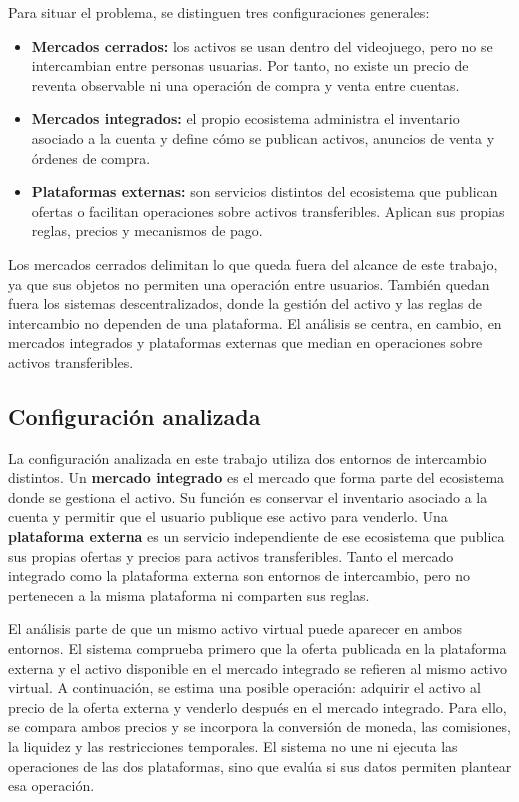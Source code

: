 Para situar el problema, se distinguen tres configuraciones generales:
\begin{itemize}
    \item \textbf{Mercados cerrados:} los activos se usan dentro del videojuego, pero no se intercambian entre personas usuarias. Por tanto, no existe un precio de reventa observable ni una operación de compra y venta entre cuentas.
    \item \textbf{Mercados integrados:} el propio ecosistema administra el inventario asociado a la cuenta y define cómo se publican activos, anuncios de venta y órdenes de compra.
    \item \textbf{Plataformas externas:} son servicios distintos del ecosistema que publican ofertas o facilitan operaciones sobre activos transferibles. Aplican sus propias reglas, precios y mecanismos de pago.
\end{itemize}

Los mercados cerrados delimitan lo que queda fuera del alcance de este trabajo, ya que sus objetos no permiten una operación entre usuarios. También quedan fuera los sistemas descentralizados, donde la gestión del activo y las reglas de intercambio no dependen de una plataforma. El análisis se centra, en cambio, en mercados integrados y plataformas externas que median en operaciones sobre activos transferibles.

\subsection{Configuración analizada}

La configuración analizada en este trabajo utiliza dos entornos de intercambio distintos. Un \textbf{mercado integrado} es el mercado que forma parte del ecosistema donde se gestiona el activo. Su función es conservar el inventario asociado a la cuenta y permitir que el usuario publique ese activo para venderlo. Una \textbf{plataforma externa} es un servicio independiente de ese ecosistema que publica sus propias ofertas y precios para activos transferibles. Tanto el mercado integrado como la plataforma externa son entornos de intercambio, pero no pertenecen a la misma plataforma ni comparten sus reglas.

El análisis parte de que un mismo activo virtual puede aparecer en ambos entornos. El sistema comprueba primero que la oferta publicada en la plataforma externa y el activo disponible en el mercado integrado se refieren al mismo activo virtual. A continuación, se estima una posible operación: adquirir el activo al precio de la oferta externa y venderlo después en el mercado integrado. Para ello, se compara ambos precios y se incorpora la conversión de moneda, las comisiones, la liquidez y las restricciones temporales. El sistema no une ni ejecuta las operaciones de las dos plataformas, sino que evalúa si sus datos permiten plantear esa operación.

